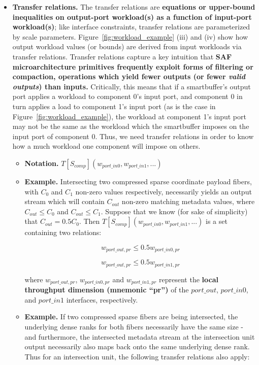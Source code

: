 \begin{itemize}
\begin{itemize}
        \item \textbf{Transfer relations.} The transfer relations are \textbf{equations or upper-bound inequalities on output-port workload(s) as a function of input-port workload(s)}; like interface constraints, transfer relations are parameterized by scale parameters. Figure~\ref{fig:workload_example} (iii) and (iv) show how output workload values (or bounds) are derived from input workloads via transfer relations. Transfer relations capture a key intuition that \textbf{SAF microarchitecture primitives frequently exploit forms of filtering or compaction, operations which yield fewer outputs (or fewer \textit{valid outputs}) than inputs.} Critically, this means that if a smartbuffer's output port applies a workload to component 0's input port, and component 0 in turn applies a load to component 1's input port (as is the case in Figure~\ref{fig:workload_example}), the workload at component 1's input port may not be the same as the workload which the smartbuffer imposes on the input port of component 0. Thus, we need transfer relations in order to know how a much workload one component will impose on others.
        \begin{itemize}
            \item \textbf{Notation.} $T[S_{comp}](w_{port\_in0},w_{port\_in1},...)$
            \item \textbf{Example.} Intersecting two compressed sparse coordinate payload fibers, with $C_0$ and $C_1$ non-zero values respectively, necessarily yields an output stream which will contain $C_{out}$ non-zero matching metadata values, where $C_{out} \leq C_0$ and $C_{out} \leq C_1$. Suppose that we know (for sake of simplicity) that $C_{out} = 0.5 C_0$. Then $T[S_{comp}](w_{port\_in0},w_{port\_in1},...)$ is a set containing two relations:

            \[w_{port\_out,pr} \leq 0.5 w_{port\_in0,pr}\]

            \[w_{port\_out,pr} \leq 0.5 w_{port\_in1,pr}\]

            where $w_{port\_out,pr}$, $w_{port\_in0,pr}$ and $w_{port\_in1,pr}$ represent the \textbf{local throughput dimension (mnemonic ``pr'')} of the $port\_out$, $port\_in0$, and $port\_in1$ interfaces, respectively.
            
            \item \textbf{Example.} If two compressed sparse fibers are being intersected, the underlying dense ranks for both fibers necessarily have the same size - and furthermore, the intersected metadata stream at the intersection unit output necessarily also maps back onto the same underlying dense rank. Thus for an intersection unit, the following transfer relations also apply:


\end{itemize}
\end{itemize}
\end{itemize}
